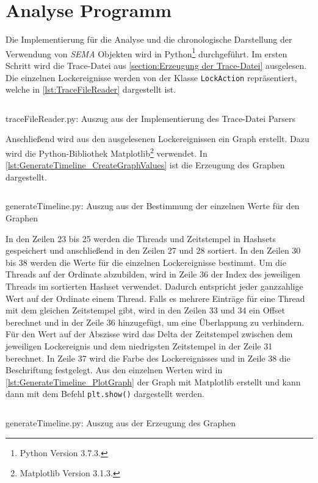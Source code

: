 \section{Analyse Programm}
\label{section:Implementierung:Analyse Programm}
Die Implementierung für die Analyse und die chronologische Darstellung der
Verwendung von \emph{SEMA} Objekten wird in Python\footnote{Python Version
3.7.3.} durchgeführt. Im ersten Schritt wird die Trace-Datei aus
\cref{section:Erzeugung der Trace-Datei} ausgelesen. Die einzelnen
Lockereignisse werden von der Klasse
\texttt{Lock\-Action} repräsentiert, welche in \cref{lst:TraceFileReader}
dargestellt ist.
\begin{listing}[ht]
  \inputminted[frame=lines,linenos,firstline=1,lastline=10]{python}{./Python/traceFileReader.py}
  \caption{traceFileReader.py: Auszug aus der Implementierung des Trace-Datei Parsers}
  \label{lst:TraceFileReader}
\end{listing}
Anschließend wird aus den ausgelesenen Lockereignissen ein Graph erstellt. Dazu
wird die Python-Bibliothek Matplotlib\footnote{Matplotlib Version 3.1.3.}
verwendet. In \cref{lst:GenerateTimeline_CreateGraphValues} ist die Erzeugung
des Graphen dargestellt.
\begin{listing}[ht]
  \inputminted[frame=lines,linenos,firstline=16,lastline=38]{python}{./Python/generateTimeline.py}
  \caption{generateTimeline.py: Auszug aus der Bestimmung der einzelnen Werte für den Graphen}
  \label{lst:GenerateTimeline_CreateGraphValues}
\end{listing}
In den Zeilen 23 bis 25 werden die Threads und Zeitstempel in Hashsets
gespeichert und anschließend in den Zeilen 27 und 28 sortiert. In den Zeilen 30
bis 38 werden die Werte für die einzelnen Lockereignisse bestimmt. Um die
Threads auf der Ordinate abzubilden, wird in Zeile 36 der Index des jeweiligen
Threads im sortierten Hashset verwendet. Dadurch entspricht jeder ganzzahlige
Wert auf der Ordinate einem Thread. Falls es mehrere Einträge für eine Thread
mit dem gleichen Zeitstempel gibt, wird in den Zeilen 33 und 34 ein Offset
berechnet und in der Zeile 36 hinzugefügt, um eine Überlappung zu verhindern.
Für den Wert auf der Abszisse wird das Delta der Zeitstempel zwischen dem
jeweiligen Lockereignis und dem niedrigsten Zeitstempel in der Zeile 31
berechnet. In Zeile 37 wird die Farbe des Lockereignisses und in Zeile 38 die
Beschriftung festgelegt. Aus den einzelnen Werten wird in
\cref{lst:GenerateTimeline_PlotGraph} der Graph mit Matplotlib erstellt und kann
dann mit dem Befehl \texttt{plt.show()} dargestellt werden.
\begin{listing}[ht]
  \inputminted[frame=lines,linenos,firstline=42,lastline=44]{python}{./Python/generateTimeline.py}
  \caption{generateTimeline.py: Auszug aus der Erzeugung des Graphen}
  \label{lst:GenerateTimeline_PlotGraph}
\end{listing}

